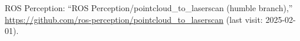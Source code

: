 \documentclass[twocolumn,9pt]{jsproceedings}
\begin{document}
\begin{thebibliography}{99}












  ROS Perception: ``ROS Perception/pointcloud\_to\_laserscan (humble branch),'' \url{https://github.com/ros-perception/pointcloud_to_laserscan} (last visit: 2025-02-01).


\end{thebibliography}
\end{document}
